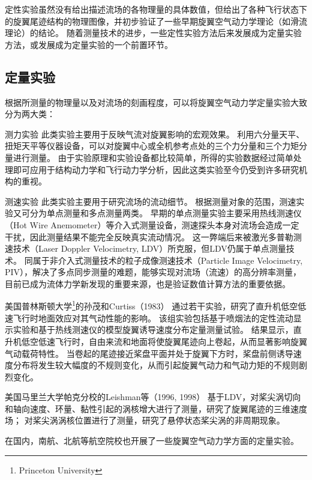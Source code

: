 \documentclass[doctor,openright,twoside,color]{buaathesis}
\begin{document}
定性实验虽然没有给出描述流场的各物理量的具体数值，但给出了各种飞行状态下的旋翼尾迹结构的物理图像，并初步验证了一些早期旋翼空气动力学理论（如滑流理论）的结论。
随着测量技术的进步，一些定性实验方法后来发展成为定量实验方法，或发展成为定量实验的一个前置环节。

\subsection{定量实验}
根据所测量的物理量以及对流场的刻画程度，可以将旋翼空气动力学定量实验大致分为两大类：
\begin{compactdesc}
  \item[测力实验]
  此类实验主要用于反映气流对旋翼影响的宏观效果。
  利用六分量天平、扭矩天平等仪器设备，可以对旋翼中心或全机参考点处的三个力分量和三个力矩分量进行测量。
  由于实验原理和实验设备都比较简单，所得的实验数据经过简单处理即可应用于结构动力学和飞行动力学分析，因此这类实验至今仍受到许多研究机构的重视。
  \item[测速实验]
  此类实验主要用于研究流场的流动细节。
  根据测量对象的范围，测速实验又可分为单点测量和多点测量两类。
  早期的单点测量实验主要采用热线测速仪（Hot Wire Anemometer）等介入式测量设备，测速探头本身对流场会造成一定干扰，因此测量结果不能完全反映真实流动情况。
  这一弊端后来被激光多普勒测速技术（Laser Doppler Velocimetry, LDV）所克服，但LDV仍属于单点测量技术。
  同属于非介入式测量技术的粒子成像测速技术（Particle Image Velocimetry, PIV），解决了多点同步测量的难题，能够实现对流场（流速）的高分辨率测量，
  目前已成为流体力学新发现的重要来源，也是验证数值计算方法的重要依据。
\end{compactdesc}

美国普林斯顿大学\footnote{Princeton University}的孙茂和Curtiss（1983）
通过若干实验，研究了直升机低空低速飞行时地面效应对其气动性能的影响。
该组实验包括基于喷烟法的定性流动显示实验和基于热线测速仪的模型旋翼诱导速度分布定量测量试验。
结果显示，直升机低空低速飞行时，自由来流和地面将使旋翼尾迹向上卷起，从而显著影响旋翼气动载荷特性。
当卷起的尾迹接近桨盘平面并处于旋翼下方时，桨盘前侧诱导速度分布将发生较大幅度的不规则变化，从而引起旋翼气动力和气动力矩的不规则剧烈变化。

美国马里兰大学帕克分校的Leishman等（1996, 1998）
基于LDV，对桨尖涡切向和轴向速度、环量、黏性引起的涡核增大进行了测量，研究了旋翼尾迹的三维速度场；
对桨尖涡涡核位置进行了测量，研究了悬停状态桨尖涡的非周期现象。

在国内，南航、北航等航空院校也开展了一些旋翼空气动力学方面的定量实验。
\end{document}
